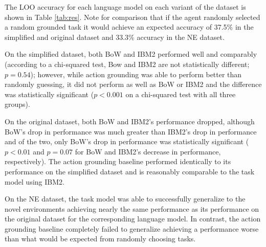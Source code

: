 \documentclass[conference]{IEEEtran}
\begin{document}
The LOO accuracy for each language model on each variant of the dataset is shown in Table \ref{tab:res}. Note for comparison that if the agent randomly selected a random grounded task it would achieve an expected accuracy of 37.5\% in the simplified and original dataset and 33.3\% accuracy in the NE dataset. 


On the simplified dataset, both BoW and IBM2 performed well and comparably (according to a chi-squared test, Bow and IBM2 are not statistically different; $p = 0.54$); however, while action grounding was able to perform better than randomly guessing, it did not perform as well as BoW or IBM2 and the difference was statistically significant ($p < 0.001$ on a chi-squared test with all three groups).

On the original dataset, both BoW and IBM2's performance dropped, although BoW's drop in performance was much greater than IBM2's drop in performance and of the two, only BoW's drop in performance was statistically significant ($p < 0.01$ and $p = 0.07$ for BoW and IBM2's decrease in performance, respectively). The action grounding baseline performed identically to its performance on the simplified dataset and is reasonably comparable to the task model using IBM2.

On the NE dataset, the task model was able to successfully generalize to the novel environments achieving nearly the same performance as its performance on the original dataset for the corresponding language model. In contrast, the action grounding baseline completely failed to generalize achieving a performance worse than what would be expected from randomly choosing tasks.

\end{document}
